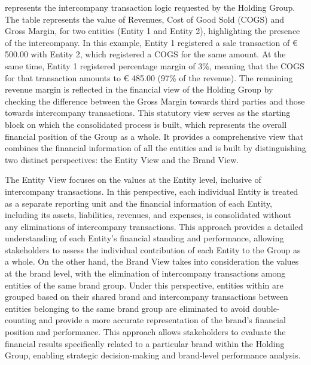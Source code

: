 \documentclass[12pt,a4paper,openright,twoside]{book}
\begin{document}
 represents the intercompany transaction logic requested by the Holding Group.
%
The table represents the value of Revenues, Cost of Good Sold (COGS) and Gross Margin, for two entities (Entity 1 and Entity 2), highlighting the presence of the intercompany.
%
In this example, Entity 1 registered a sale transaction of € 500.00 with Entity 2, which registered a COGS for the same amount. 
%
At the same time, Entity 1 registered percentage margin of 3\%, meaning that the COGS for that transaction amounts to € 485.00 (97\% of the revenue).
%
The remaining revenue margin is reflected in the financial view of the Holding Group by checking the difference between the Gross Margin towards third parties and those towards intercompany transactions.
%
This statutory view serves as the starting block on which the consolidated process is built, which represents the overall financial position of the Group as a whole.
%
It provides a comprehensive view that combines the financial information of all the entities and is built by distinguishing two distinct perspectives: the Entity View and the Brand View.

The Entity View focuses on the values at the Entity level, inclusive of intercompany transactions.
%
In this perspective, each individual Entity is treated as a separate reporting unit and the financial information of each Entity, including its assets, liabilities, revenues, and expenses, is consolidated without any eliminations of intercompany transactions. 
%
This approach provides a detailed understanding of each Entity's financial standing and performance, allowing stakeholders to assess the individual contribution of each Entity to the Group as a whole.
%
On the other hand, the Brand View takes into consideration the values at the brand level, with the elimination of intercompany transactions among entities of the same brand group. 
%
Under this perspective, entities within are grouped based on their shared brand and intercompany transactions between entities belonging to the same brand group are eliminated to avoid double-counting and provide a more accurate representation of the brand's financial position and performance. 
%
This approach allows stakeholders to evaluate the financial results specifically related to a particular brand within the Holding Group, enabling strategic decision-making and brand-level performance analysis.
\end{document}
